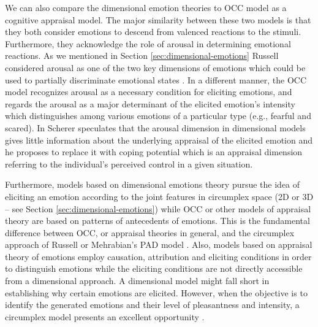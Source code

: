 \documentclass[12pt]{report}
\begin{document}
We can also compare the dimensional emotion theories to OCC model as a cognitive
appraisal model. The major similarity between these two models is that they both
consider emotions to descend from valenced reactions to the stimuli.
Furthermore, they acknowledge the role of arousal in determining emotional
reactions. As we mentioned in Section \ref{sec:dimensional-emotions} Russell
considered arousal as one of the two key dimensions of emotions which could be
used to partially discriminate emotional states
\cite{russell:circumplex-affect}. In a different manner, the OCC model
recognizes arousal as a necessary condition for eliciting emotions, and regards
the arousal as a major determinant of the elicited emotion's intensity which
distinguishes among various emotions of a particular type (e.g., fearful and
scared). In \cite{scherer:what-emotions} Scherer speculates that the arousal
dimension in dimensional models gives little information about the underlying
appraisal of the elicited emotion and he proposes to replace it with coping
potential which is an appraisal dimension referring to the individual's
perceived control in a given situation.

Furthermore, models based on dimensional emotions theory pursue the idea of
eliciting an emotion according to the joint features in circumplex space (2D or
3D -- see Section \ref{sec:dimensional-emotions}) while OCC or other
models of appraisal theory are based on patterns of antecedents of emotions.
This is the fundamental difference between OCC, or appraisal theories in
general, and the circumplex approach of Russell \cite{russell:circumplex-affect}
or Mehrabian's PAD model \cite{mehrabian:pad,mehrabian-russell:pad}. Also,
models based on appraisal theory of emotions employ causation, attribution and
eliciting conditions in order to distinguish emotions while the eliciting
conditions are not directly accessible from a dimensional approach. A
dimensional model might fall short in establishing why certain emotions are elicited.
However, when the objective is to identify the generated emotions and their
level of pleasantness and intensity, a circumplex model presents an excellent
opportunity \cite{ahmadpour:occ-dimensional-comparison}.
\end{document}

